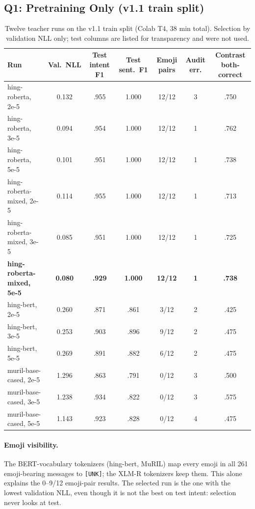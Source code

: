 \documentclass[11pt,a4paper]{article}
\theoremstyle{remark}
\begin{document}
\subsection{Q1: Pretraining Only (v1.1 train split)}
\label{sec:teacher1}
\begin{table}[h]
\centering\small
\caption{Twelve teacher runs on the v1.1 train split (Colab T4, 38 min total). Selection by validation NLL only; test columns are listed for transparency and were not used.}
\label{tab:teacher1}
\setlength{\tabcolsep}{4pt}
\begin{tabular}{@{}l c c c c c c@{}}
\toprule
Run & Val.\ NLL & Test intent F1 & Test sent.\ F1 & Emoji pairs & Audit err. & Contrast both-correct \\
\midrule
hing-roberta, 2e-5          & 0.132 & .955 & 1.000 & 12/12 & 3 & .750 \\
hing-roberta, 3e-5          & 0.094 & .954 & 1.000 & 12/12 & 1 & .762 \\
hing-roberta, 5e-5          & 0.101 & .951 & 1.000 & 12/12 & 1 & .738 \\
hing-roberta-mixed, 2e-5    & 0.114 & .955 & 1.000 & 12/12 & 1 & .713 \\
hing-roberta-mixed, 3e-5    & 0.085 & .951 & 1.000 & 12/12 & 1 & .725 \\
\textbf{hing-roberta-mixed, 5e-5} & \textbf{0.080} & \textbf{.929} & \textbf{1.000} & \textbf{12/12} & \textbf{1} & \textbf{.738} \\
hing-bert, 2e-5             & 0.260 & .871 & .861 & 3/12 & 2 & .425 \\
hing-bert, 3e-5             & 0.253 & .903 & .896 & 9/12 & 2 & .475 \\
hing-bert, 5e-5             & 0.269 & .891 & .882 & 6/12 & 2 & .475 \\
muril-base-cased, 2e-5      & 1.296 & .863 & .791 & 0/12 & 3 & .500 \\
muril-base-cased, 3e-5      & 1.238 & .934 & .822 & 0/12 & 3 & .575 \\
muril-base-cased, 5e-5      & 1.143 & .923 & .828 & 0/12 & 4 & .475 \\
\bottomrule
\end{tabular}
\end{table}

\paragraph{Emoji visibility.} The BERT-vocabulary tokenizers (hing-bert, MuRIL) map every emoji in all 261 emoji-bearing messages to \texttt{[UNK]}; the XLM-R tokenizers keep them. This alone explains the 0--9/12 emoji-pair results. The selected run is the one with the lowest validation NLL, even though it is not the best on test intent: selection never looks at test.
\end{document}
